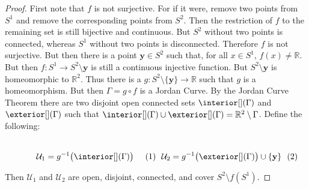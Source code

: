             \begin{proof}
                First note that $f$ is not surjective. For if it were,
                remove two points from $S^{1}$ and remove the corresponding
                points from $S^{2}$. Then the restriction of $f$ to the
                remaining set is still bijective and continuous. But
                $S^{2}$ without two points is connected, whereas $S^{1}$
                without two points is disconnected. Therefore $f$ is not
                surjective. But then there is a point $\mathbf{y}\in{S}^{2}$
                such that, for all $x\in{S}^{1}$, $f(x)\ne\mathbb{R}$.
                But then $f:S^{1}\rightarrow{S}^{2}\setminus\mathbf{y}$
                is still a continuous injective function. But
                $S^{2}\setminus\mathbf{y}$ is homeomorphic to $\mathbb{R}^{2}$.
                Thus there is a
                $g:S^{2}\setminus\{\mathbf{y}\}\rightarrow\mathbb{R}$
                such that $g$ is a homeomorphism. But then $\Gamma=g\circ{f}$
                is a Jordan Curve. By the Jordan Curve Theorem there are two
                disjoint open connected sets $\interior[](\Gamma)$ and $\exterior[](\Gamma)$
                such that
                $\interior[](\Gamma)\cup\exterior[](\Gamma)=\mathbb{R}^{2}\setminus\Gamma$.
                Define the following:
                \par
                \begin{subequations}
                    \begin{minipage}[b]{0.49\textwidth}
                        \centering
                        \begin{equation}
                            \mathcal{U}_{1}=g^{-1}\big(\interior[](\Gamma)\big)
                        \end{equation}
                    \end{minipage}
                    \hfill
                    \begin{minipage}[b]{0.49\textwidth}
                        \begin{equation}
                            \mathcal{U}_{2}
                            =g^{-1}\big(\exterior[](\Gamma)\big)\cup\{\mathbf{y}\}
                        \end{equation}
                    \end{minipage}
                \end{subequations}
                \par\hfill\par
                Then $\mathcal{U}_{1}$ and $\mathcal{U}_{2}$ are open, disjoint,
                connected, and cover $S^{2}\setminus{f}(S^{1})$.
            \end{proof}
